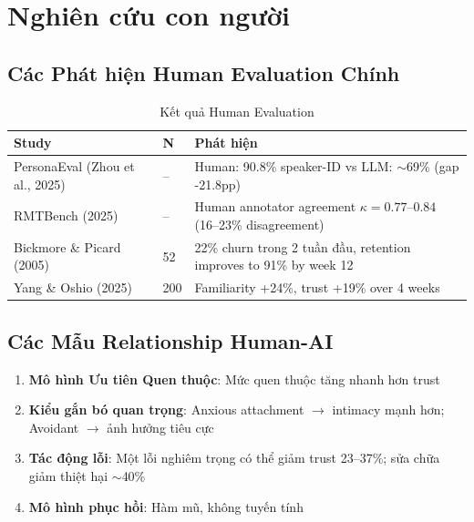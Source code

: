 \documentclass[10pt,leqno]{amsart}
\begin{document}

\section{Nghiên cứu con người}

\subsection{Các Phát hiện Human Evaluation Chính}

\begin{table}[H]
\centering
\caption{Kết quả Human Evaluation}
\label{tab:human-studies}
\begin{tabular}{lll}
\toprule
\textbf{Study} & \textbf{N} & \textbf{Phát hiện} \\
\midrule
PersonaEval (Zhou et al., 2025) & -- & Human: 90.8\% speaker-ID vs LLM: $\sim$69\% (gap -21.8pp) \\
RMTBench (2025) & -- & Human annotator agreement $\kappa=0.77$--$0.84$ (16--23\% disagreement) \\
Bickmore \& Picard (2005) & 52 & 22\% churn trong 2 tuần đầu, retention improves to 91\% by week 12 \\
Yang \& Oshio (2025) & 200 & Familiarity +24\%, trust +19\% over 4 weeks \\
\bottomrule
\end{tabular}
\end{table}

\subsection{Các Mẫu Relationship Human-AI}

\begin{enumerate}
    \item \textbf{Mô hình Ưu tiên Quen thuộc}: Mức quen thuộc tăng nhanh hơn trust
    \item \textbf{Kiểu gắn bó quan trọng}: Anxious attachment $\to$ intimacy mạnh hơn; Avoidant $\to$ ảnh hưởng tiêu cực
    \item \textbf{Tác động lỗi}: Một lỗi nghiêm trọng có thể giảm trust 23--37\%; sửa chữa giảm thiệt hại $\sim$40\%
    \item \textbf{Mô hình phục hồi}: Hàm mũ, không tuyến tính
\end{enumerate}
\end{document}
